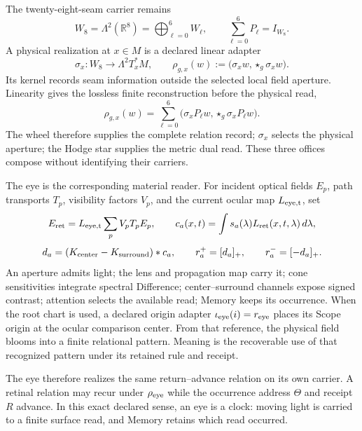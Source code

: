 \documentclass[10pt]{article}
\newcommand{\R}{\mathbb R}
\begin{document}
The twenty-eight-seam carrier remains
\begin{equation}
W_8=\Lambda^2(\R^8)=\bigoplus_{\ell=0}^6W_\ell,
\qquad \sum_{\ell=0}^6P_\ell=I_{W_8}.
\end{equation}
A physical realization at $x\in M$ is a declared linear adapter
\begin{equation}
\sigma_x:W_8\longrightarrow\Lambda^2T_x^*M,
\qquad
\rho_{g,x}(w):=\bigl(\sigma_xw,\star_g\sigma_xw\bigr).
\label{eq:physicalcondensation}
\end{equation}
Its kernel records seam information outside the selected local field aperture.
Linearity gives the lossless finite reconstruction before the physical read,
\begin{equation}
\boxed{\rho_{g,x}(w)
=\sum_{\ell=0}^6
\bigl(\sigma_xP_\ell w,\star_g\sigma_xP_\ell w\bigr).}
\end{equation}
The wheel therefore supplies the complete relation record; $\sigma_x$ selects
the physical aperture; the Hodge star supplies the metric dual read. These
three offices compose without identifying their carriers.

The eye is the corresponding material reader. For incident optical fields
$E_p$, path transports $T_p$, visibility factors $V_p$, and the current ocular
map $L_{\rm eye,t}$, set
\begin{equation}
E_{\rm ret}=L_{\rm eye,t}\sum_pV_pT_pE_p,
\qquad
c_a(x,t)=\int s_a(\lambda)L_{\rm ret}(x,t,\lambda)\,d\lambda,
\end{equation}
\begin{equation}
d_a=(K_{\rm center}-K_{\rm surround})*c_a,
\qquad r_a^+=[d_a]_+,\qquad r_a^-=[-d_a]_+.
\label{eq:eyereader}
\end{equation}
An aperture admits light; the lens and propagation map carry it; cone
sensitivities integrate spectral Difference; center--surround channels expose
signed contrast; attention selects the available read; Memory keeps its
occurrence. When the root chart is used, a declared origin adapter
$\iota_{\rm eye}(i)=r_{\rm eye}$ places its Scope origin at the ocular
comparison center. From that reference, the physical field blooms into a
finite relational pattern. Meaning is the recoverable use of that recognized
pattern under its retained rule and receipt.

The eye therefore realizes the same return--advance relation on its own
carrier. A retinal relation may recur under $\rho_{\rm eye}$ while the
occurrence address $\Theta$ and receipt $R$ advance. In this exact declared
sense, an eye is a clock: moving light is carried to a finite surface read,
and Memory retains which read occurred.
\end{document}
